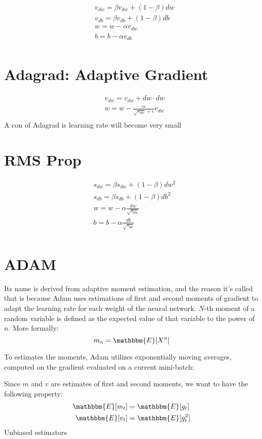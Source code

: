 \begin{align*}
    &v_{dw} = \beta v_{dw} + (1-\beta)dw \\
    &v_{db} = \beta v_{db} + (1-\beta)db \\
    & w = w-\alpha v_{dw}\\
    & b = b-\alpha v_{db}\\
\end{align*}

\section{Adagrad: Adaptive Gradient}
\begin{align*}
    &v_{dw} = v_{dw} + dw \cdot dw \\
	& w = w-\frac{\alpha}{\sqrt{v_{dw}}+\epsilon} v_{dw}\\
\end{align*}
A con of Adagrad is learning rate will become very small


\section{RMS Prop}

\begin{align*}
    &s_{dw} = \beta s_{dw} + (1-\beta)dw^2 \\
    &s_{db} = \beta s_{db} + (1-\beta)db^2 \\
	& w = w-\alpha  \frac{dw}{\sqrt{s_{dw}}}\\
	& b = b-\alpha \frac{db}{\sqrt{s_{db}}} \\
\end{align*}

\section{ADAM}
Its name is derived from adaptive moment estimation, and the reason it's called that is because Adam uses estimations of first and second moments of gradient to adapt the learning rate for each weight of the neural network. $N$-th moment of a random variable is defined as the expected value of that variable to the power of $n$. More formally:
$$m_n = \mathbbm{E}[X^n]$$

To estimates the moments, Adam utilizes exponentially moving averages, computed on the gradient evaluated on a current mini-batch:

Since $m$ and $v$ are estimates of first and second moments, we want to have the following property:
\begin{align}
	\mathbbm{E}[m_t] &= \mathbbm{E}[g_t]\\
	\mathbbm{E}[v_t] &= \mathbbm{E}[g_t^2]\\
\end{align}
Unbiased estimators

